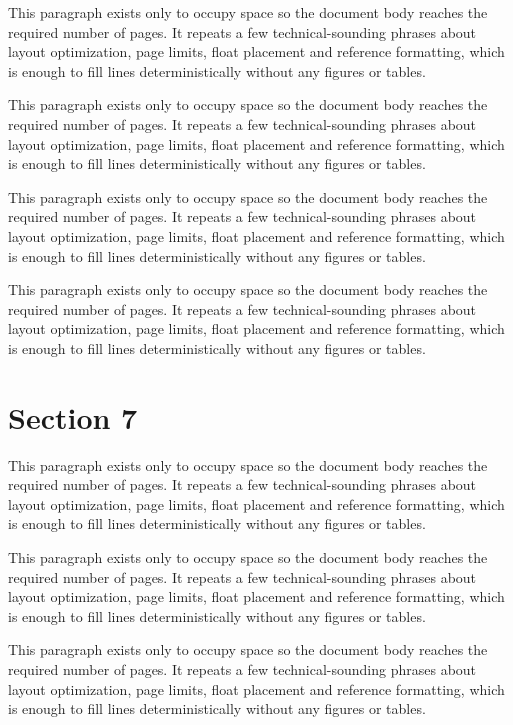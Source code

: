 \documentclass[10pt,letterpaper]{article}
\begin{document}
This paragraph exists only to occupy space so the document body reaches the required number of pages. It repeats a few technical-sounding phrases about layout optimization, page limits, float placement and reference formatting, which is enough to fill lines deterministically without any figures or tables.

This paragraph exists only to occupy space so the document body reaches the required number of pages. It repeats a few technical-sounding phrases about layout optimization, page limits, float placement and reference formatting, which is enough to fill lines deterministically without any figures or tables.

This paragraph exists only to occupy space so the document body reaches the required number of pages. It repeats a few technical-sounding phrases about layout optimization, page limits, float placement and reference formatting, which is enough to fill lines deterministically without any figures or tables.

This paragraph exists only to occupy space so the document body reaches the required number of pages. It repeats a few technical-sounding phrases about layout optimization, page limits, float placement and reference formatting, which is enough to fill lines deterministically without any figures or tables.

\section{Section 7}
This paragraph exists only to occupy space so the document body reaches the required number of pages. It repeats a few technical-sounding phrases about layout optimization, page limits, float placement and reference formatting, which is enough to fill lines deterministically without any figures or tables.

This paragraph exists only to occupy space so the document body reaches the required number of pages. It repeats a few technical-sounding phrases about layout optimization, page limits, float placement and reference formatting, which is enough to fill lines deterministically without any figures or tables.

This paragraph exists only to occupy space so the document body reaches the required number of pages. It repeats a few technical-sounding phrases about layout optimization, page limits, float placement and reference formatting, which is enough to fill lines deterministically without any figures or tables.
\end{document}
